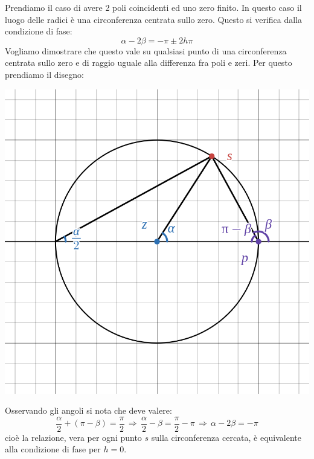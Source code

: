\documentclass[a4paper,11pt]{article}
\begin{document}
\begin{enumerate}
		Prendiamo il caso di avere 2 poli coincidenti ed uno zero finito.
		In questo caso il luogo delle radici è una circonferenza centrata sullo zero.
		Questo si verifica dalla condizione di fase:
		$$
		\alpha - 2 \beta = - \pi \pm 2 h \pi
		$$
		Vogliamo dimostrare che questo vale su qualsiasi punto di una circonferenza centrata sullo zero e di raggio uguale alla differenza fra poli e zeri.
		Per questo prendiamo il disegno:
		\begin{center}
			\includegraphics[scale=0.28]{../figures/rlocus_circ.png}
		\end{center}
		Osservando gli angoli si nota che deve valere:
		$$
		\frac{\alpha}{2} + (\pi - \beta) = \frac{\pi}{2} \, \Rightarrow \, \frac{\alpha}{2} - \beta = \frac{\pi}{2} - \pi \, \Rightarrow \, \alpha - 2 \beta = -\pi
		$$
		cioè la relazione, vera per ogni punto $s$ sulla circonferenza cercata, è equivalente alla condizione di fase per $h = 0$.

	\newpage


\end{enumerate}
\end{document}
